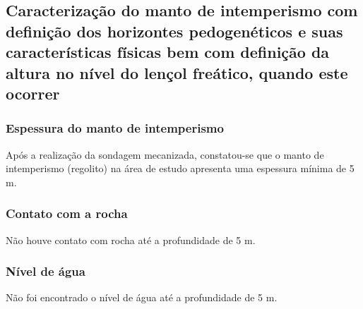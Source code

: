 \subsection{Caracterização do manto de intemperismo com definição dos horizontes pedogenéticos e suas características físicas bem com definição da altura no nível do lençol freático, quando este ocorrer}

\subsubsection*{Espessura do manto de intemperismo}

Após a realização da sondagem mecanizada, constatou-se que o manto de intemperismo (regolito) na área de estudo apresenta uma espessura mínima de 5 m.

\subsubsection*{Contato com a rocha}

Não houve contato com rocha até a profundidade de 5 m.

\subsubsection*{Nível de água}

Não foi encontrado o nível de água até a profundidade de 5 m.

